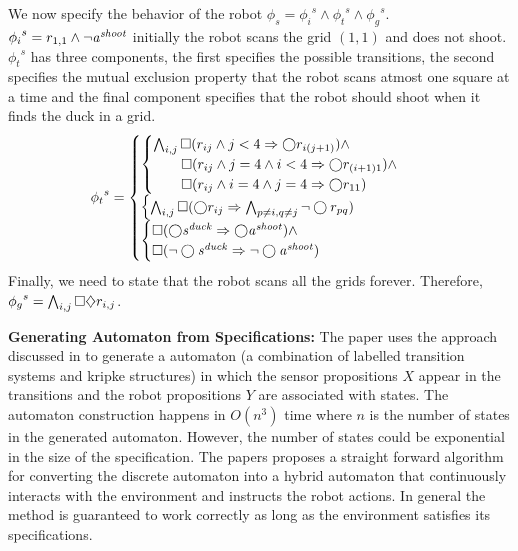 We now specify the behavior of the robot $\phi_s = {\phi_i}^s \wedge {\phi_t}^s \wedge {\phi_g}^s$.
${\phi_i}^s = r_{1,1} \wedge \neg \mathit{a^{shoot}}$ initially the robot scans the grid $(1,1)$ and does not shoot.
${\phi_t}^s$ has three components, the first specifies the possible transitions, the second specifies the
mutual exclusion property that the robot scans atmost one square at a time and the final component 
specifies that the robot should shoot when it finds the duck in a grid.
%
\begin{align*}
{\phi_t}^s = 
\begin{cases}
\begin{cases}
\bigwedge_{i,j} \always (r_{ij} \wedge j < 4 \Rightarrow \next r_{i(j+1)}) \wedge  \\
\qquad  \always (r_{ij} \wedge j=4 \wedge i<4 \Rightarrow \next r_{(i+1)1}) \wedge  \\
\qquad \always (r_{ij} \wedge i=4 \wedge j=4 \Rightarrow \next r_{11}) 
\end{cases} \\
%
\begin{cases}
\bigwedge_{i,j} \always (\next r_{ij} \Rightarrow \bigwedge_{p \ne i,q \ne j} \neg \next r_{pq})
\end{cases} \\
%
\begin{cases}
\always (\next \duck \Rightarrow \next \shoot) \wedge \\
\always (\neg \next \duck \Rightarrow \neg \next \shoot) 
\end{cases} 
\end{cases}
\end{align*}
%
Finally, we need to state that the robot scans all the grids forever. Therefore, 
${\phi_g}^s = \bigwedge_{i,j} \square \diamondsuit r_{i,j}$.

\textbf{Generating Automaton from Specifications:}
The paper uses the approach discussed in \cite{pnueli:VMCAI06} to generate a automaton (a combination
of labelled transition systems and kripke structures) in which the sensor propositions $X$ appear 
in the transitions and the robot propositions $Y$ are associated with states. 
The automaton construction happens in $O(n^3)$ time where $n$ is the number of states in the generated
automaton. However, the number of states could be exponential in the size of the specification.
The papers proposes a straight forward algorithm for converting the discrete automaton into a
hybrid automaton that continuously interacts with the environment and instructs the robot actions.
In general the method is guaranteed to work correctly as long as the environment satisfies its specifications.

